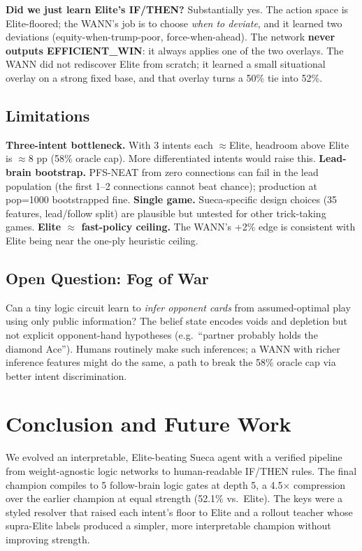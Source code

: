 \documentclass[runningheads]{llncs}
\begin{document}
\textbf{Did we just learn Elite's IF/THEN?} Substantially yes. The action space
is Elite-floored; the WANN's job is to choose \emph{when to deviate}, and it
learned two deviations (equity-when-trump-poor, force-when-ahead). The network
\textbf{never outputs EFFICIENT\_WIN}: it always applies one of the two
overlays. The WANN did not rediscover Elite from scratch; it learned a small
situational overlay on a strong fixed base, and that overlay turns a 50\% tie
into 52\%.

\subsection{Limitations}

\textbf{Three-intent bottleneck.} With 3 intents each $\approx$Elite, headroom
above Elite is $\approx$8 pp (58\% oracle cap). More differentiated intents
would raise this. \textbf{Lead-brain bootstrap.} PFS-NEAT from zero connections
can fail in the lead population (the first 1--2 connections cannot beat chance);
production at pop=1000 bootstrapped fine. \textbf{Single game.} Sueca-specific
design choices (35 features, lead/follow split) are plausible but untested for
other trick-taking games. \textbf{Elite $\approx$ fast-policy ceiling.} The
WANN's +2\% edge is consistent with Elite being near the one-ply heuristic ceiling.

\subsection{Open Question: Fog of War}

Can a tiny logic circuit learn to \emph{infer opponent cards} from
assumed-optimal play using only public information? The belief state encodes
voids and depletion but not explicit opponent-hand hypotheses (e.g.\ ``partner
probably holds the diamond Ace''). Humans routinely make such inferences; a
WANN with richer inference features might do the same, a path to break the
58\% oracle cap via better intent discrimination.

\section{Conclusion and Future Work}

We evolved an interpretable, Elite-beating Sueca agent with a verified pipeline
from weight-agnostic logic networks to human-readable IF/THEN rules. The final
champion compiles to 5 follow-brain logic gates at depth 5, a 4.5$\times$
compression over the earlier champion at equal strength (52.1\% vs.\ Elite). The keys
were a styled resolver that raised each intent's floor to Elite and a rollout
teacher whose supra-Elite labels produced a simpler, more interpretable
champion without improving strength.
\end{document}
